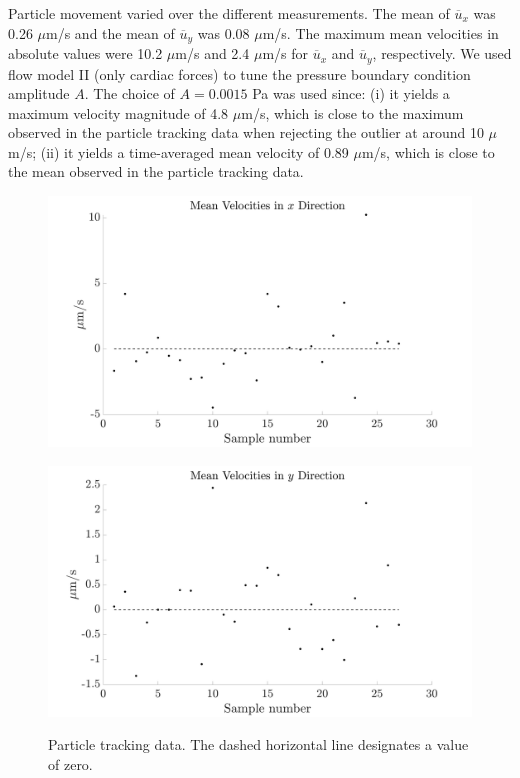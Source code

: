 \documentclass[fleqn]{wlscirep}
\begin{document}
Particle movement varied over the different measurements. The mean of $\overline{u}_x$ was 0.26 $\mu$m/s and the mean of $\overline{u}_y$ was 0.08 $\mu$m/s. The maximum mean velocities in absolute values were 10.2 $\mu$m/s and 2.4 $\mu$m/s for $\overline{u}_x$ and $\overline{u}_y$, respectively. We used flow model II (only cardiac forces) to tune the pressure boundary condition amplitude $A$. The choice of $A=0.0015$ Pa was used since: (i) it yields a maximum velocity magnitude of 4.8 $\mu$m/s, which is close to the maximum observed in the particle tracking data when rejecting the outlier at around 10 $\mu$m/s; (ii) it yields a time-averaged mean velocity of 0.89 $\mu$m/s, which is close to the mean observed in the particle tracking data.
\begin{figure}[H]
    \begin{minipage}[t]{0.49\textwidth}
        \includegraphics[width=\textwidth]{graphics/mean_velocities_x.png}
        \label{fig:meanx}
    \end{minipage}
    \begin{minipage}[t]{0.49\textwidth}
        \includegraphics[width=\textwidth]{graphics/mean_velocities_y.png}
        \label{fig:meany}
    \end{minipage} 
    \caption{Particle tracking data. The dashed horizontal line designates a value of zero.}\label{fig:particle_tracking_data}
\end{figure}
\clearpage
{}
\end{document}
